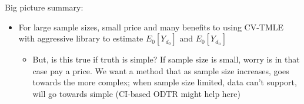 \documentclass[11pt]{article}\usepackage[]{graphicx}\usepackage[]{color}
\begin{document}
\noindent Big picture summary:
\begin{itemize}
    \item For large sample sizes, small price and many benefits to using CV-TMLE with aggressive library to estimate $E_0[Y_{d_0}]$ and $E_0[Y_{d_n}]$
    \begin{itemize}
        \item But, is this true if truth is simple? If sample size is small, worry is in that case pay a price. We want a method that as sample size increases, goes towards the more complex; when sample size limited, data can't support, will go towards simple (CI-based ODTR might help here)
    \end{itemize}
\end{itemize}
\end{document}
